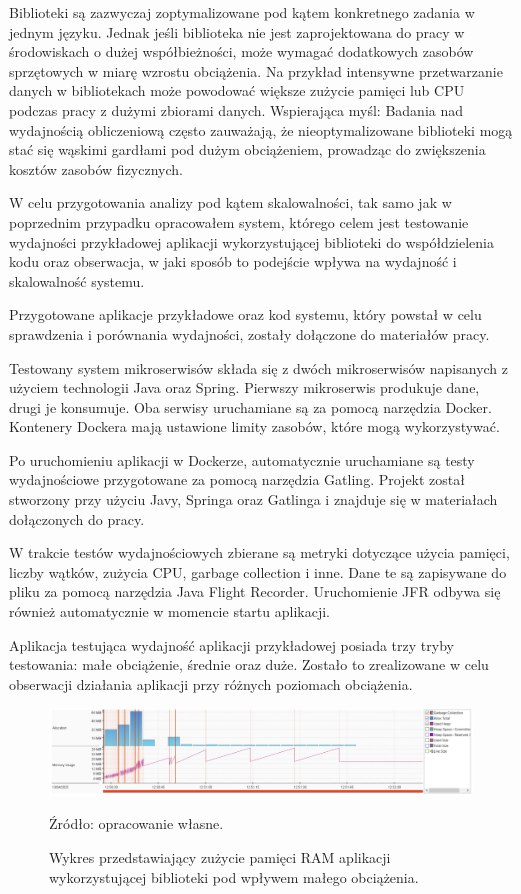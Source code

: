 \documentclass[runningheads,12pt]{llncs}
\begin{document}
Biblioteki są zazwyczaj zoptymalizowane pod kątem konkretnego zadania w jednym języku. Jednak jeśli biblioteka nie jest zaprojektowana do pracy w środowiskach o dużej współbieżności, może wymagać dodatkowych zasobów sprzętowych w miarę wzrostu obciążenia. Na przykład intensywne przetwarzanie danych w bibliotekach może powodować większe zużycie pamięci lub CPU podczas pracy z dużymi zbiorami danych. Wspierająca myśl: Badania nad wydajnością obliczeniową często zauważają, że nieoptymalizowane biblioteki mogą stać się wąskimi gardłami pod dużym obciążeniem, prowadząc do zwiększenia kosztów zasobów fizycznych. ~\cite[p. 192]{fowler2012patterns}

W celu przygotowania analizy pod kątem skalowalności, tak samo jak w poprzednim przypadku opracowałem system, którego celem jest testowanie wydajności przykładowej aplikacji wykorzystującej biblioteki do współdzielenia kodu oraz obserwacja, w jaki sposób to podejście wpływa na wydajność i skalowalność systemu.

Przygotowane aplikacje przykładowe oraz kod systemu, który powstał w celu sprawdzenia i porównania wydajności, zostały dołączone do materiałów pracy.

Testowany system mikroserwisów składa się z dwóch mikroserwisów napisanych z użyciem technologii Java oraz Spring. Pierwszy mikroserwis produkuje dane, drugi je konsumuje. Oba serwisy uruchamiane są za pomocą narzędzia Docker. Kontenery Dockera mają ustawione limity zasobów, które mogą wykorzystywać.

Po uruchomieniu aplikacji w Dockerze, automatycznie uruchamiane są testy wydajnościowe przygotowane za pomocą narzędzia Gatling. Projekt został stworzony przy użyciu Javy, Springa oraz Gatlinga i znajduje się w materiałach dołączonych do pracy.

W trakcie testów wydajnościowych zbierane są metryki dotyczące użycia pamięci, liczby wątków, zużycia CPU, garbage collection i inne. Dane te są zapisywane do pliku za pomocą narzędzia Java Flight Recorder. Uruchomienie JFR odbywa się również automatycznie w momencie startu aplikacji.

Aplikacja testująca wydajność aplikacji przykładowej posiada trzy tryby testowania: małe obciążenie, średnie oraz duże. Zostało to zrealizowane w celu obserwacji działania aplikacji przy różnych poziomach obciążenia.

\newpage

\begin{figure}
    \includegraphics[width=\linewidth]{images/library-memory-low-graph.jpg}
    \caption{Wykres przedstawiający zużycie pamięci RAM aplikacji wykorzystującej biblioteki pod wpływem małego obciążenia.} \label{fig1}
    \vspace{0.5em}
    {\small Źródło: opracowanie własne.}
\end{figure}
\end{document}
